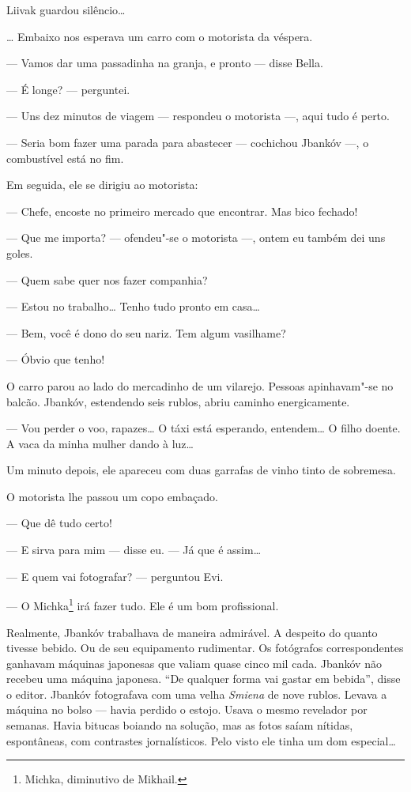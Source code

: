 Liivak guardou silêncio\ldots{}

\ldots{} Embaixo nos esperava um carro com o motorista da véspera.

--- Vamos dar uma passadinha na granja, e pronto --- disse
Bella.

--- É longe? --- perguntei.

--- Uns dez minutos de viagem --- respondeu o motorista
---, aqui tudo é perto.

--- Seria bom fazer uma parada para abastecer ---
cochichou Jbankóv ---, o combustível está no fim.

Em seguida, ele se dirigiu ao motorista:

--- Chefe, encoste no primeiro mercado que encontrar. Mas bico
fechado!

--- Que me importa? --- ofendeu"-se o motorista ---,
ontem eu também dei uns goles.

--- Quem sabe quer nos fazer companhia?

--- Estou no trabalho\ldots{} Tenho tudo pronto em casa\ldots{}

--- Bem, você é dono do seu nariz. Tem algum vasilhame?

--- Óbvio que tenho!

O carro parou ao lado do mercadinho de um vilarejo. Pessoas apinhavam"-se
no balcão. Jbankóv, estendendo seis rublos, abriu caminho energicamente.

--- Vou perder o voo, rapazes\ldots{} O táxi está esperando,
entendem\ldots{} O filho doente. A vaca da minha mulher dando à luz\ldots{}

Um minuto depois, ele apareceu com duas garrafas de vinho tinto de
sobremesa.

O motorista lhe passou um copo embaçado.

--- Que dê tudo certo!

--- E sirva para mim --- disse eu. --- Já que é
assim\ldots{}

--- E quem vai fotografar? --- perguntou Evi.

--- O Michka\footnote{Michka, diminutivo de Mikhail.} irá fazer
tudo. Ele é um bom profissional.

Realmente, Jbankóv trabalhava de maneira admirável. A despeito do quanto
tivesse bebido. Ou de seu equipamento rudimentar. Os fotógrafos
correspondentes ganhavam máquinas japonesas que valiam quase cinco mil
cada. Jbankóv não recebeu uma máquina japonesa. ``De qualquer forma vai
gastar em bebida'', disse o editor. Jbankóv fotografava com uma velha
\emph{Smiena} de nove rublos. Levava a máquina no bolso --- havia
perdido o estojo. Usava o mesmo revelador por semanas. Havia bitucas
boiando na solução, mas as fotos saíam nítidas, espontâneas, com
contrastes jornalísticos. Pelo visto ele tinha um dom especial\ldots{}

